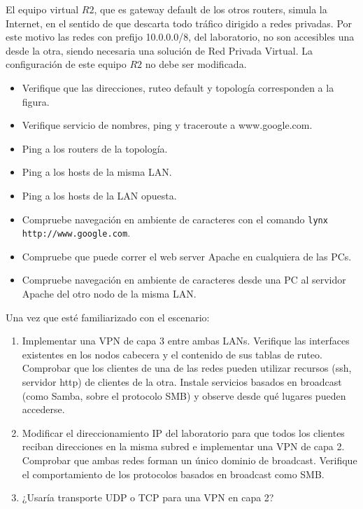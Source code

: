 
El equipo virtual $R2$, que es gateway default de los otros routers, simula la Internet, en el sentido de que descarta todo tráfico dirigido a redes privadas. Por este motivo las redes con prefijo 10.0.0.0/8, del laboratorio, no son accesibles una desde la otra, siendo necesaria una solución de Red Privada Virtual. La configuración de este equipo $R2$ no debe ser modificada.

\begin{itemize}
	\item Verifique que las direcciones, ruteo default y topología corresponden a la figura.
	\item Verifique servicio de nombres, ping y traceroute a www.google.com.
	\item Ping a los routers de la topología.
	\item Ping a los hosts de la misma LAN.
	\item Ping a los hosts de la LAN opuesta. 
	\item Compruebe navegación en ambiente de caracteres con el comando \texttt{lynx http://www.google.com}.
	\item Compruebe que puede correr el web server Apache en cualquiera de las PCs. 
	\item Compruebe navegación en ambiente de caracteres desde una PC al servidor Apache del otro nodo de la misma LAN.
\end{itemize}

Una vez que esté familiarizado con el escenario:
\begin{enumerate}
	\item Implementar una VPN de capa 3 entre ambas LANs. Verifique las interfaces existentes en los nodos cabecera y el contenido de sus tablas de ruteo. Comprobar que los  clientes de una de las redes pueden utilizar recursos (ssh, servidor http) de clientes de la otra. Instale servicios basados en broadcast (como Samba, sobre el protocolo SMB) y observe desde qué lugares pueden accederse.
	\item Modificar el direccionamiento IP del laboratorio para que todos los clientes reciban direcciones en la misma subred e implementar una VPN de capa 2. Comprobar que ambas redes forman un único dominio de broadcast. Verifique el comportamiento de los protocolos basados en broadcast como SMB. 
	\item ¿Usaría transporte UDP o TCP para una VPN en capa 2?
\end{enumerate}
